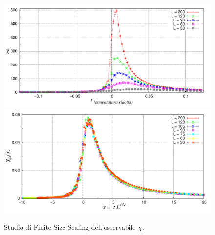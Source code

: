 \begin{figure}[htbp]
      \centering
      \caption[ParteD\_Ossvst.cpp $\;\rightarrow\;$ Chivst\_file.p ]{Studio di Finite Size Scaling dell'osservabile $\chi$.}\label{fig: Chi_finitesize_1}
	\includegraphics[width=1\textwidth]{Immagini/ParteD/Chivst}
	\bigskip
	\includegraphics[width=1\textwidth]{Immagini/ParteD/Chivst_finite}
\end{figure}

